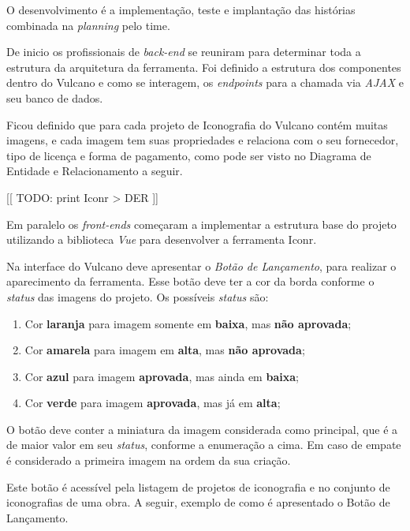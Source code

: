 \documentclass[
  12pt,				%
  openany,
  oneside,
  a4paper,			%
  english,			%
  brazil
]{article}
\numberwithin{figure}{section}
\numberwithin{table}{section}
\begin{document}
O desenvolvimento é a implementação, teste e implantação das histórias combinada na \textit{planning} pelo time.

De inicio os profissionais de \textit{back-end} se reuniram para determinar toda a estrutura da arquitetura da ferramenta. Foi definido a estrutura dos componentes dentro do Vulcano e como se interagem,  os \textit{endpoints} para a chamada via \textit{AJAX} e seu banco de dados.

Ficou definido que para cada projeto de Iconografia do Vulcano contém muitas imagens, e cada imagem tem suas propriedades e relaciona com o seu fornecedor, tipo de licença e forma de pagamento, como pode ser visto no Diagrama de Entidade e Relacionamento a seguir.

[[ TODO: print Iconr > DER ]] 

Em paralelo os \textit{front-ends} começaram a implementar a estrutura base do projeto utilizando a biblioteca \textit{Vue} para desenvolver a ferramenta Iconr. 

Na interface do Vulcano deve apresentar o \emph{Botão de Lançamento}, para realizar o aparecimento da ferramenta. Esse botão deve ter a cor da borda conforme o \textit{status} das imagens do projeto. Os possíveis \textit{status} são:

\begin{singlespace}
	\begin{enumerate}
		\item Cor \textbf{laranja} para imagem somente em \textbf{baixa}, mas \textbf{não aprovada};
		\item Cor \textbf{amarela} para imagem em \textbf{alta}, mas \textbf{não aprovada};
		\item Cor \textbf{azul} para imagem \textbf{aprovada}, mas ainda em \textbf{baixa};
		\item Cor \textbf{verde} para imagem \textbf{aprovada}, mas já em \textbf{alta};
	\end{enumerate}
\end{singlespace}

O botão deve conter a miniatura da imagem considerada como principal, que é a de maior valor em seu \textit{status}, conforme a enumeração a cima. Em caso de empate é considerado a primeira imagem na ordem da sua criação.

Este botão é acessível pela listagem de projetos de iconografia e no conjunto de iconografias de uma obra. A seguir, exemplo de como é apresentado o Botão de Lançamento.
\end{document}
